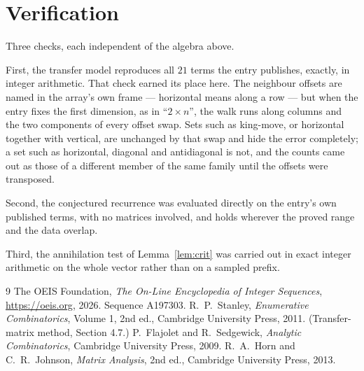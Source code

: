 \documentclass[11pt,a4paper]{article}
\theoremstyle{plain}
\theoremstyle{definition}
\begin{document}
\section{Verification}

Three checks, each independent of the algebra above.

First, the transfer model reproduces all $21$ terms the entry publishes, exactly, in
integer arithmetic. That check earned its place here. The neighbour offsets are named in the
array's own frame --- horizontal means along a row --- but when the entry fixes the first
dimension, as in ``$2\times n$'', the walk runs along columns and the two components of every
offset swap. Sets such as king-move, or horizontal together with vertical, are unchanged by
that swap and hide the error completely; a set such as horizontal, diagonal and antidiagonal
is not, and the counts came out as those of a different member of the same family until the
offsets were transposed.

Second, the conjectured recurrence was evaluated directly on the entry's own published terms,
with no matrices involved, and holds wherever the proved range and the data overlap.

Third, the annihilation test of Lemma~\ref{lem:crit} was carried out in exact integer
arithmetic on the whole vector rather than on a sampled prefix.

\begin{thebibliography}{9}
 The OEIS Foundation, \emph{The On-Line Encyclopedia of Integer
Sequences}, \url{https://oeis.org}, 2026. Sequence A197303.
 R.~P.~Stanley, \emph{Enumerative Combinatorics}, Volume 1, 2nd ed.,
Cambridge University Press, 2011. (Transfer-matrix method, Section 4.7.)
 P.~Flajolet and R.~Sedgewick, \emph{Analytic Combinatorics}, Cambridge
University Press, 2009.
 R.~A.~Horn and C.~R.~Johnson, \emph{Matrix Analysis}, 2nd ed., Cambridge
University Press, 2013.
\end{thebibliography}
\end{document}

